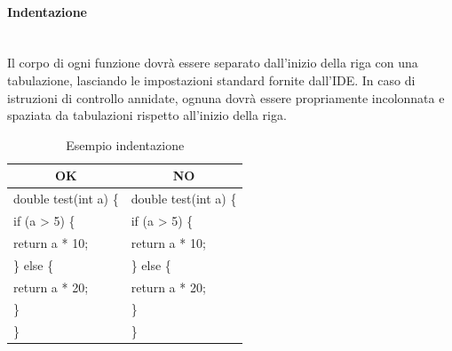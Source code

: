 \paragraph{Indentazione}\mbox{}\\[0.4cm]
Il corpo di ogni funzione dovrà essere separato dall’inizio della riga con una tabulazione, lasciando le impostazioni standard fornite dall’IDE. In caso di istruzioni di controllo annidate, ognuna dovrà essere propriamente incolonnata e spaziata da tabulazioni rispetto all'inizio della riga.
\begin{table} [H]
	\begin{center}
		\begin{tabular}{ | l | l |}
			\multicolumn{1}{c}{\textbf{OK}}&\multicolumn{1}{c}{\textbf{NO}}\\ 
			\hline
			double test(int a) \{ & double test(int a) \{\\
			\hspace{0.5cm}if (a > 5) \{ 			   &  if (a > 5) \{\\
			\hspace{1cm}return a * 10;          & \hspace{0.5cm}return a * 10;\\
		    \hspace{0.5cm}\} else \{ 					& \} else \{\\
			\hspace{1cm}return a * 20;          & \hspace{0.5cm}return a * 20;\\
			\hspace{0.5cm}\}								& \}\\
			\}								& \}\\
			\hline
		\end{tabular}
	\end{center}
\caption{Esempio indentazione}
\end{table}
